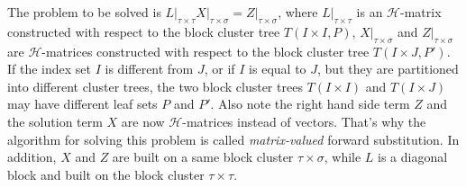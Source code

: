 \documentclass[11pt, a4paper]{book}
\begin{document}
The problem to be solved is
$L \big\vert_{\tau\times\tau} X \big\vert_{\tau\times\sigma} = Z
\big\vert_{\tau\times\sigma}$, where $L \big\vert_{\tau\times\tau}$ is an
$\mathcal{H}$-matrix constructed with respect to the block cluster tree $T(I\times I, P)$,
$X \big\vert_{\tau\times\sigma}$ and $Z \big\vert_{\tau\times\sigma}$ are
$\mathcal{H}$-matrices constructed with respect to the block cluster tree
$T(I\times J, P')$. If the index set $I$ is different from $J$, or if $I$ is equal to $J$,
but they are partitioned into different cluster trees, the two block cluster trees
$T(I\times I)$ and $T(I\times J)$ may have different leaf sets $P$ and $P'$. Also note the
right hand side term $Z$ and the solution term $X$ are now $\mathcal{H}$-matrices instead
of vectors. That's why the algorithm for solving this problem is called
\emph{matrix-valued} forward substitution. In addition, $X$ and $Z$ are built on a same
block cluster $\tau\times\sigma$, while $L$ is a diagonal block and built on the block
cluster $\tau\times\tau$.
\end{document}
